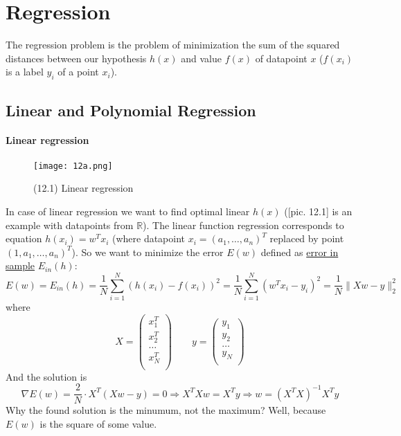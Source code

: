 \chapter{Regression}

{\sf The regression problem is the problem of minimization the sum of the squared distances between our hypothesis $h(x)$ and value $f(x)$ of datapoint $x$ ($f(x_i)$ is a label $y_i$ of a point $x_i$).}

\section{Linear and Polynomial Regression}
\vspace{-0.6cm}
\subsubsection*{Linear regression}

\begin{wrapfigure}{r}{0.3\linewidth}
	\vspace{-3cm}
  \begin{center}
    \texttt{[image: 12a.png]}
  \end{center}
  \vspace{-0.8cm}
  \caption*{(12.1) Linear regression}
\end{wrapfigure}
In case of linear regression we want to find optimal linear $h(x)$ ([pic. 12.1] is an example with datapoints from $\mathbb{R}$). The linear function regression corresponds to equation $h(x_i)=w^Tx_i$ (where datapoint $x_i=(a_1,\ldots,a_n)^T$ replaced by point $(1, a_1,\ldots,a_n)^T$). So we want to minimize the error $E(w)$ defined as \hyperlink{ein_and_eout}{error in sample} $E_{in}(h)$:
$$E(w)=E_{in}(h)=\frac{1}{N}\sum\limits_{i=1}^{N}(h(x_i)-f(x_i))^2=\frac{1}{N}\sum\limits_{i=1}^{N}(w^Tx_i-y_i)^2=\frac{1}{N}\|Xw-y\|_2^2$$
where
$$X=\begin{pmatrix}
	x_1^T \\
	x_2^T \\
	\ldots \\
	x_N^T \\
	\end{pmatrix} \qquad
	y=\begin{pmatrix}
	y_1 \\
	y_2 \\
	\ldots \\
	y_N \\
	\end{pmatrix}$$
And the solution is
$$\nabla E(w)=\frac{2}{N}\cdot X^T(Xw-y)=0\Rightarrow X^TXw=X^Ty\Rightarrow w=(X^TX)^{-1}X^Ty$$
Why the found solution is the minumum, not the maximum? Well, because $E(w)$ is the square of some value.

